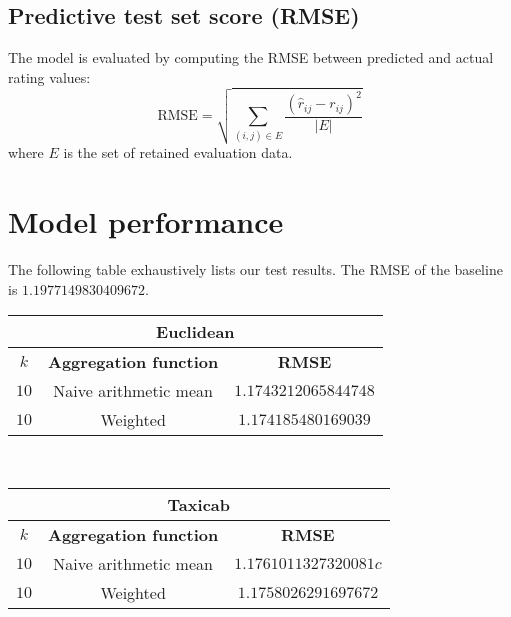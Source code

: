 \documentclass[final]{cvpr}
\begin{document}
\subsection{Predictive test set score (RMSE)}
The model is evaluated by computing the RMSE between predicted and actual rating values:
$$ \text{RMSE} = \sqrt{\sum_{(i, j) \in E} \frac{{(\hat r_{ij} - r_{ij})}^2}{\left| E \right|}} $$
where $E$ is the set of retained evaluation data.

\section{Model performance}
The following table exhaustively lists our test results.
The RMSE of the baseline is $1.1977149830409672$.


\begin{tabular}{| c | c | c |}
    \hline
    \multicolumn{3}{|c|}{\textbf{Euclidean}}\\
    \hline
		$k$ & \textbf{Aggregation function} & \textbf{RMSE}\\
    \hline
    $10$ & Naive arithmetic mean & $1.1743212065844748$\\
    \hline
    $10$ & Weighted & $1.174185480169039$\\
    \hline
\end{tabular}\\

\hspace{2em}

\begin{tabular}{| c | c | c |}
    \hline
    \multicolumn{3}{|c|}{\textbf{Taxicab}}\\
    \hline
		$k$ & \textbf{Aggregation function} & \textbf{RMSE}\\
    \hline
    $10$ & Naive arithmetic mean & $1.1761011327320081c$\\
    \hline
    $10$ & Weighted & $1.1758026291697672$\\
    \hline
\end{tabular}\\
\end{document}
